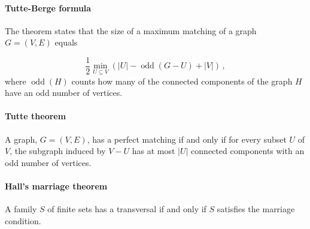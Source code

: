 \paragraph{Tutte-Berge formula}
The theorem states that the size of a maximum matching of a graph $G=(V,E)$ equals

$${\frac {1}{2}}\min _{U\subseteq V}\left(|U|-\operatorname {odd} (G-U)+|V|\right)\,,$$
where $\operatorname {odd} (H)$ counts how many of the connected components of the graph $H$ have an odd number of vertices.

\paragraph{Tutte theorem}

A graph, $G = (V, E)$, has a perfect matching if and only if for every subset $U$ of $V$, the subgraph induced by $V-U$ has at most $|U|$ connected components with an odd number of vertices.

\paragraph{Hall's marriage theorem}

A family $S$ of finite sets has a transversal if and only if $S$ satisfies the marriage condition.

